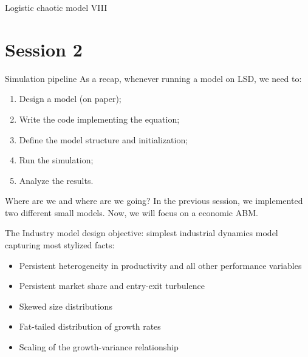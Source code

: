 \documentclass[bigger,aspectratio=169]{beamer}
\begin{document}
\begin{frame}[label={sec:orgfb803d7}]{Logistic chaotic model VIII}
\begin{center}

\end{center}
\end{frame}
\section{Session 2}
\label{sec:orgb5c5d0a}

\begin{frame}[label={sec:org9f90e5e}]{Simulation pipeline}
As a recap, whenever running a model on LSD, we need to:

\begin{enumerate}
\item Design a model (on paper);
\item Write the code implementing the equation;
\item Define the model structure and initialization;
\item Run the simulation;
\item Analyze the results.
\end{enumerate}
\begin{block}{Where are we and where are we going?}
In the previous session, we implemented two different small models.
Now, we will focus on a economic ABM.
\end{block}
\end{frame}
\begin{frame}[label={sec:org562d3f6}]{The Industry model}
\textcite{dosi_2017_footprint} design objective: simplest industrial dynamics model capturing most \alert{stylized facts}:
\begin{itemize}
\item Persistent heterogeneity in productivity and all other performance variables
\item Persistent market share and entry-exit turbulence
\item Skewed size distributions
\item Fat-tailed distribution of growth rates
\item Scaling of the growth-variance relationship
\end{itemize}
\end{frame}
\end{document}
